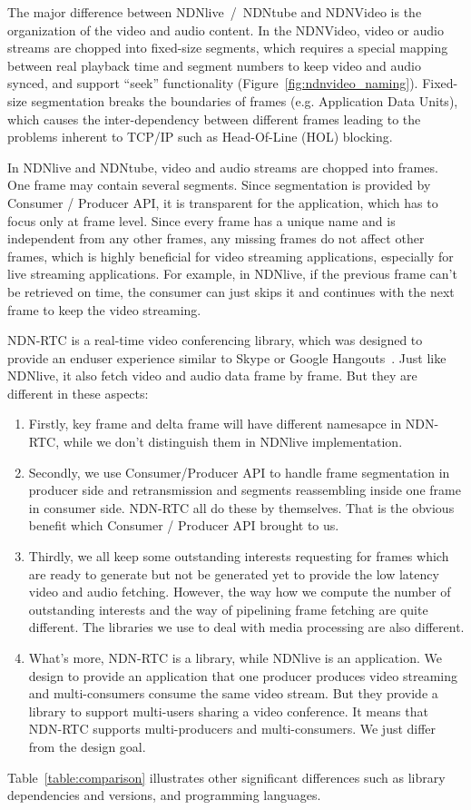 The major difference between NDNlive~/~NDNtube and NDNVideo is the organization of the video and audio content. In the NDNVideo, video or audio streams are chopped into fixed-size segments, which requires a special mapping between real playback time and segment numbers to keep video and audio synced, and support ``seek'' functionality (Figure~\ref{fig:ndnvideo_naming}). Fixed-size segmentation breaks the boundaries of frames (e.g. Application Data Units), which causes the inter-dependency between different frames leading to the problems inherent to TCP/IP such as Head-Of-Line (HOL) blocking.

In NDNlive and NDNtube, video and audio streams are chopped into frames. One frame may contain several segments. Since segmentation is provided by Consumer / Producer API, it is transparent for the application, which has to focus only at frame level. Since every frame has a unique name and is independent from any other frames, any missing frames do not affect other frames, which is highly beneficial for video streaming applications, especially for live streaming applications. For example, in NDNlive, if the previous frame can't be retrieved on time, the consumer can just skips it and continues with the next frame to keep the video streaming. 

NDN-RTC is a real-time video conferencing library, which was designed to provide an enduser experience similar to Skype or Google Hangouts~\cite{ndn-rtc}\cite{ndnrtc-icn}. Just like NDNlive, it also fetch video and audio data frame by frame. But they are different in these aspects:
\begin{enumerate}
	\item Firstly, key frame and delta frame will have different namesapce in NDN-RTC, while we don't distinguish them in NDNlive implementation. 

	\item Secondly, we use Consumer/Producer API to handle frame segmentation in producer side and retransmission and segments reassembling inside one frame in consumer side. NDN-RTC all do these by themselves. That is the obvious benefit which Consumer / Producer API brought to us. 

	\item Thirdly, we all keep some outstanding interests requesting for frames which are ready to generate but not be generated yet to provide the low latency video and audio fetching. However, the way how we compute the number of outstanding interests and the way of pipelining frame fetching are quite different. The libraries we use to deal with media processing are also different. 

	\item What's more, NDN-RTC is a library, while NDNlive is an application. We design to provide an application that one producer produces video streaming and multi-consumers consume the same video stream. But they provide a library to support multi-users sharing a video conference. It means that NDN-RTC supports multi-producers and multi-consumers. We just differ from the design goal.
\end{enumerate}
Table~\ref{table:comparison} illustrates other significant differences such as library dependencies and versions, and programming languages.



